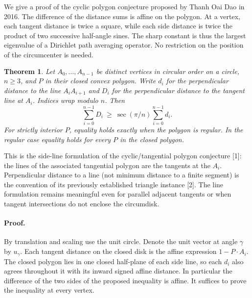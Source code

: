 \documentclass[11pt,a4paper]{article}
\numberwithin{equation}{section}
\newtheorem{theorem}{Theorem}[section]
\theoremstyle{definition}
\theoremstyle{remark}
\newenvironment{sectionabstract}{\par\smallskip\begingroup\small\noindent}{\par\endgroup\medskip}
\begin{document}
\begin{sectionabstract}
We give a proof of the cyclic polygon conjecture proposed by Thanh Oai Dao in 2016. The difference of the distance sums is affine on the polygon. At a vertex, each tangent distance is twice a square, while each side distance is twice the product of two successive half-angle sines. The sharp constant is thus the largest eigenvalue of a Dirichlet path averaging operator. No restriction on the position of the circumcenter is needed.
\end{sectionabstract}
\begin{theorem}
Let $A_0,\ldots,A_{n-1}$ be distinct vertices in circular order on a circle, $n\ge3$, and $P$ in their closed convex polygon. Write $d_i$ for the perpendicular distance to the line $A_iA_{i+1}$ and $D_i$ for the perpendicular distance to the tangent line at $A_i$. Indices wrap modulo $n$. Then
\[
 \sum_{i=0}^{n-1} D_i\ \ge\ \sec(\pi/n)\sum_{i=0}^{n-1}d_i .
\]
For strictly interior $P$, equality holds exactly when the polygon is regular. In the regular case equality holds for every $P$ in the closed polygon.
\end{theorem}
This is the side-line formulation of the cyclic/tangential polygon conjecture [1]: the lines of the associated tangential polygon are the tangents at the $A_i$. Perpendicular distance to a line (not minimum distance to a finite segment) is the convention of its previously established triangle instance [2]. The line formulation remains meaningful even for parallel adjacent tangents or when tangent intersections do not enclose the circumdisk.

\paragraph{Proof.}
By translation and scaling use the unit circle. Denote the unit vector at angle $\gamma$ by $u_\gamma$. Each tangent distance on the closed disk is the affine expression $1-P\cdot A_i$. The closed polygon lies in one closed half-plane of each side line, so each $d_i$ also agrees throughout it with its inward signed affine distance. In particular the difference of the two sides of the proposed inequality is affine. It suffices to prove the inequality at every vertex.
\end{document}
